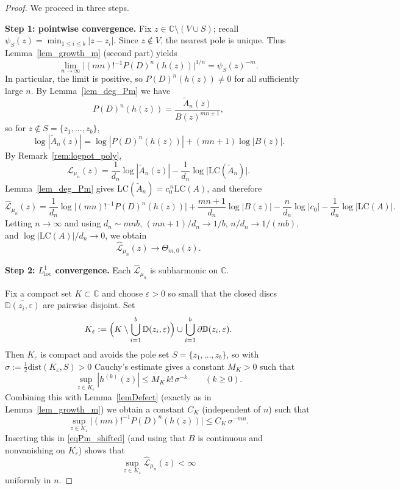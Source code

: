 \documentclass[12pt]{article}
\theoremstyle{plain}
\theoremstyle{definition}
\begin{document}
\begin{proof}
We proceed in three steps.

\smallskip
\noindent\textbf{Step 1: pointwise convergence.}
Fix $z\in\mathbb C\setminus(V\cup S)$; recall $\psi_S(z)=\min_{1\le i\le b}|z-z_i|$.
Since $z\notin V$, the nearest pole is unique.
Thus Lemma~\ref{lem_growth_m} (second part) yields
$$\lim_{n\to\infty}\bigl|(mn)!^{-1}P(D)^n(h(z))\bigr|^{1/n}=\psi_S(z)^{-m}.$$
In particular, the limit is positive, so $P(D)^n(h(z))\neq0$ for all sufficiently large $n$.
By Lemma~\ref{lem_deg_Pm} we have
$$P(D)^n(h(z))=\frac{\widetilde A_n(z)}{B(z)^{mn+1}},$$
so for $z\notin S=\{z_1,\dots,z_b\}$,
$$\log|\widetilde A_n(z)|=\log|P(D)^n(h(z))|+(mn+1)\log|B(z)|.$$
By Remark~\ref{rem:logpot_poly},
$$\mathcal L_{\mu_n}(z)=\frac{1}{d_n}\log|\widetilde A_n(z)|-\frac{1}{d_n}\log\bigl|\mathrm{LC}(\widetilde A_n)\bigr|.$$
Lemma~\ref{lem_deg_Pm} gives $\mathrm{LC}(\widetilde A_n)=c_0^{\,n}\mathrm{LC}(A)$, and therefore
\begin{equation}\label{eqPm_shifted}
\widehat{\mathcal L}_{\mu_n}(z)
=\frac{1}{d_n}\log\bigl|(mn)!^{-1}P(D)^n(h(z))\bigr|
+\frac{mn+1}{d_n}\log|B(z)|
-\frac{n}{d_n}\log|c_0|
-\frac{1}{d_n}\log|\mathrm{LC}(A)|.
\end{equation}
Letting $n\to\infty$ and using $d_n\sim mnb$, $(mn+1)/d_n\to 1/b$, $n/d_n\to 1/(mb)$, and $\log|\mathrm{LC}(A)|/d_n\to0$, we obtain
$$\widehat{\mathcal L}_{\mu_n}(z)\to \Theta_{m,0}(z).$$

\smallskip
\noindent\textbf{Step 2: $L^1_{\mathrm{loc}}$ convergence.}
Each $\widehat{\mathcal L}_{\mu_n}$ is subharmonic on $\mathbb C$.

Fix a compact set $K\subset\mathbb C$ and choose $\varepsilon>0$ so small that the closed discs $\overline{\mathbb{D}(z_i,\varepsilon)}$ are pairwise disjoint.
Set
$$K_\varepsilon:=\Bigl(K\setminus\bigcup_{i=1}^b \mathbb{D}(z_i,\varepsilon)\Bigr)\cup\bigcup_{i=1}^b \partial\mathbb{D}(z_i,\varepsilon).$$
Then $K_\varepsilon$ is compact and avoids the pole set $S=\{z_1,\dots,z_b\}$, so with $\sigma:=\tfrac12\mathrm{dist}(K_\varepsilon,S)>0$ Cauchy's estimate gives a constant $M_K>0$ such that
$$\sup_{z\in K_\varepsilon}|h^{(k)}(z)|\le M_K\,k!\,\sigma^{-k}\qquad(k\ge0).$$
Combining this with Lemma~\ref{lemDefect} (exactly as in Lemma~\ref{lem_growth_m}) we obtain a constant $C_K$ (independent of $n$) such that
$$\sup_{z\in K_\varepsilon}\bigl|(mn)!^{-1}P(D)^n(h(z))\bigr|\le C_K\,\sigma^{-mn}.$$
Inserting this in \eqref{eqPm_shifted} (and using that $B$ is continuous and nonvanishing on $K_\varepsilon$) shows that
$$\sup_{z\in K_\varepsilon}\widehat{\mathcal L}_{\mu_n}(z)<\infty$$
uniformly in $n$.


\end{proof}
\end{document}
